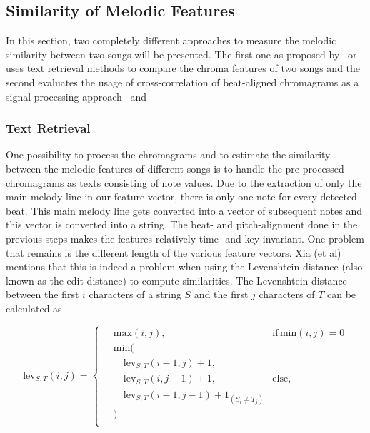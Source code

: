 \subsection{Similarity of Melodic Features}

In this section, two completely different approaches to measure the melodic similarity between two songs will be presented. The first one as proposed by~\cite{chroma1} or~\cite{chroma4} uses text retrieval methods to compare the chroma features of two songs and the second evaluates the usage of cross-correlation of beat-aligned chromagrams as a signal processing approach~\cite{chroma2} and~\cite{chroma3}

\subsubsection{Text Retrieval}\label{textretr}

One possibility to process the chromagrams and to estimate the similarity between the melodic features of different songs is to handle the pre-processed chromagrams as texts consisting of note values. Due to the extraction of only the main melody line in our feature vector, there is only one note for every detected beat. This main melody line gets converted into a vector of subsequent notes and this vector is converted into a string. The beat- and pitch-alignment done in the previous steps makes the features relatively time- and key invariant. One problem that remains is the different length of the various feature vectors. Xia (et al)~\cite{chroma4} mentions that this is indeed a problem when using the Levenshtein distance (also known as the edit-distance) to compute similarities. The Levenshtein distance between the first $i$ characters of a string $S$ and the first $j$ characters of $T$ can be calculated as 

\begin{equation} \label{eq:tr1}
\text{lev}_{S,T}(i, j) = \begin{cases}
\quad\text{max}(i, j), & \text{if} \, \text{min}(i, j) = 0\\
\quad\text{min}(\\
	\quad\quad\text{lev}_{S,T}(i-1, j) + 1,\\ 
	\quad\quad\text{lev}_{S,T}(i, j-1) + 1,	& \text{else},\\
	\quad\quad\text{lev}_{S,T}(i-1, j-1) + 1_{(S_i \neq T_j)}\\
	\quad)\\ 
	\end{cases}
\end{equation}

